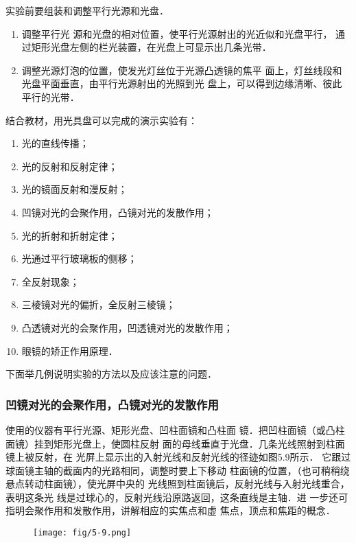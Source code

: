 实验前要组装和调整平行光源和光盘．
\begin{enumerate}
\item 调整平行光
源和光盘的相对位置，使平行光源射出的光近似和光盘平行，
通过矩形光盘左侧的栏光装置，在光盘上可显示出几条光带．
\item 调整光源灯泡的位置，使发光灯丝位于光源凸透镜的焦平
面上，灯丝线段和光盘平面垂直，由平行光源射出的光照到光
盘上，可以得到边缘清晰、彼此平行的光带．
\end{enumerate}

结合教材，用光具盘可以完成的演示实验有：
\begin{enumerate}
    \item 光的直线传播；
    \item 光的反射和反射定律；
    \item 光的镜面反射和漫反射；
    \item 凹镜对光的会聚作用，凸镜对光的发散作用；
    \item 光的折射和折射定律；
    \item 光通过平行玻璃板的侧移；
    \item 全反射现象；
    \item 三棱镜对光的偏折，全反射三棱镜；
    \item 凸透镜对光的会聚作用，凹透镜对光的发散作用；
    \item 眼镜的矫正作用原理．
\end{enumerate}

下面举几例说明实验的方法以及应该注意的问题．

\subsubsection{凹镜对光的会聚作用，凸镜对光的发散作用}

使用的仪器有平行光源、矩形光盘、凹柱面镜和凸柱面
镜．把凹柱面镜（或凸柱面镜）挂到矩形光盘上，使圆柱反射
面的母线垂直于光盘．几条光线照射到柱面镜上被反射，在
光屏上显示出的入射光线和反射光线的径迹如图5.9所示．
它跟过球面镜主轴的截面内的光路相同，调整时要上下移动
柱面镜的位置，（也可稍稍绕悬点转动柱面镜），使光屏中央的
光线照到柱面镜后，反射光线与入射光线重合，表明这条光
线是过球心的，反射光线沿原路返回，这条直线是主轴．进
一步还可指明会聚作用和发散作用，讲解相应的实焦点和虚
焦点，顶点和焦距的概念．

\begin{figure}[htp]
    \centering
    \texttt{[image: fig/5-9.png]}
    \caption{}
\end{figure}

